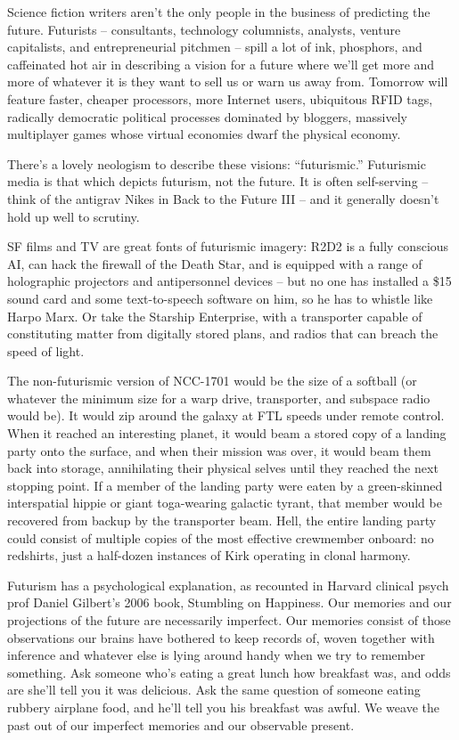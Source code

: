 Science fiction writers aren't the only people in the business of
predicting the future. Futurists -- consultants, technology
columnists, analysts, venture capitalists, and entrepreneurial
pitchmen -- spill a lot of ink, phosphors, and caffeinated hot air
in describing a vision for a future where we'll get more and more
of whatever it is they want to sell us or warn us away from.
Tomorrow will feature faster, cheaper processors, more Internet
users, ubiquitous RFID tags, radically democratic political
processes dominated by bloggers, massively multiplayer games whose
virtual economies dwarf the physical economy.

There's a lovely neologism to describe these visions: ``futurismic.''
Futurismic media is that which depicts futurism, not the future. It
is often self-serving -- think of the antigrav Nikes in Back to the
Future III -- and it generally doesn't hold up well to scrutiny.

SF films and TV are great fonts of futurismic imagery: R2D2 is a
fully conscious AI, can hack the firewall of the Death Star, and is
equipped with a range of holographic projectors and antipersonnel
devices -- but no one has installed a \$15 sound card and some
text-to-speech software on him, so he has to whistle like Harpo
Marx. Or take the Starship Enterprise, with a transporter capable
of constituting matter from digitally stored plans, and radios that
can breach the speed of light.

The non-futurismic version of NCC-1701 would be the size of a
softball (or whatever the minimum size for a warp drive,
transporter, and subspace radio would be). It would zip around the
galaxy at FTL speeds under remote control. When it reached an
interesting planet, it would beam a stored copy of a landing party
onto the surface, and when their mission was over, it would beam
them back into storage, annihilating their physical selves until
they reached the next stopping point. If a member of the landing
party were eaten by a green-skinned interspatial hippie or giant
toga-wearing galactic tyrant, that member would be recovered from
backup by the transporter beam. Hell, the entire landing party
could consist of multiple copies of the most effective crewmember
onboard: no redshirts, just a half-dozen instances of Kirk
operating in clonal harmony.

Futurism has a psychological explanation, as recounted in Harvard
clinical psych prof Daniel Gilbert's 2006 book, Stumbling on
Happiness. Our memories and our projections of the future are
necessarily imperfect. Our memories consist of those observations
our brains have bothered to keep records of, woven together with
inference and whatever else is lying around handy when we try to
remember something. Ask someone who's eating a great lunch how
breakfast was, and odds are she'll tell you it was delicious. Ask
the same question of someone eating rubbery airplane food, and
he'll tell you his breakfast was awful. We weave the past out of
our imperfect memories and our observable present.

